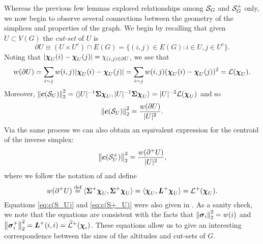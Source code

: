 Whereas the previous few lemmas explored relationships among $\mathcal{S}_G$ and $\mathcal{S}_G^+$ only, we now begin to observe several connections between the geometry of the simplices and properties of the graph. We begin by recalling that given $U\subset V(G)$ the \emph{cut-set} of $U$ is 
\[\partial U \equiv (U\times U^c)\cap E(G)= \{(i,j)\in E(G): i\in U, j\in U^c\}.\]
Noting that $|\boldsymbol{\chi}_U(i)-\boldsymbol{\chi}_U(j)|=\chi_{(i,j)\in \partial U}$, we see that
\begin{align*}
w(\partial U) = \sum_{i\sim j} w(i,j)|\boldsymbol{\chi}_U(i)-\boldsymbol{\chi}_U(j)| = \sum_{i\sim j } w(i,j)(\boldsymbol{\chi}_U(i)-\boldsymbol{\chi}_U(j))^2 = \mathcal{L}(\boldsymbol{\chi}_U). 
\end{align*}
Moreover, $\norm{\vb*{c}(\mathcal{S}_U)}^2_2 = \langle |U|^{-1} \boldsymbol{\Sigma}\boldsymbol{\chi}_U,|U|^{-1} \boldsymbol{\Sigma}\boldsymbol{\chi}_U\rangle = |U|^{-2} \mathcal{L}(\boldsymbol{\chi}_U)$ and so 
\begin{equation}
\label{eq:c(S_U)}
\norm{\vb*{c}(\mathcal{S}_U)}_2^2 = \frac{w(\partial U)}{|U|^2}.
\end{equation}
Via the same process we can also obtain an equivalent expression for the centroid of the inverse simplex: 
\begin{equation}
\label{eq:c(S+_U)}
\norm{\vb*{c}(\mathcal{S}^+_U)}_2^2 = \frac{w(\partial^+ U)}{|U|^2},
\end{equation}
where we follow the notation of \cite{devriendt2018simplex} and define \begin{equation}
\label{eq:w(d^+)}
w(\partial^+U) \overset{\text{def}}{=}  \langle \boldsymbol{\Sigma}^+\boldsymbol{\chi}_U,\boldsymbol{\Sigma}^+\boldsymbol{\chi}_U\rangle=\langle \boldsymbol{\chi}_U,\vb*{L}^+\boldsymbol{\chi}_U\rangle=\mathcal{L}^+(\boldsymbol{\chi}_U).
\end{equation} 
Equations \eqref{eq:c(S_U)} and \eqref{eq:c(S+_U)} were also given in \cite{devriendt2018simplex}. As a sanity check, we note that the equations are consistent with the facts that $\norm{\vb*{\sigma}_i}_2^2 = w(i)$ and $\norm{\vb*{\sigma}_i^+}_2^2 = \vb*{L}^+(i,i) = \widehat{\mathcal{L}}^+(\boldsymbol{\chi}_i)$. These equations allow us to give an interesting correspondence between the sizes of the altitudes and cut-sets of $G$. 

